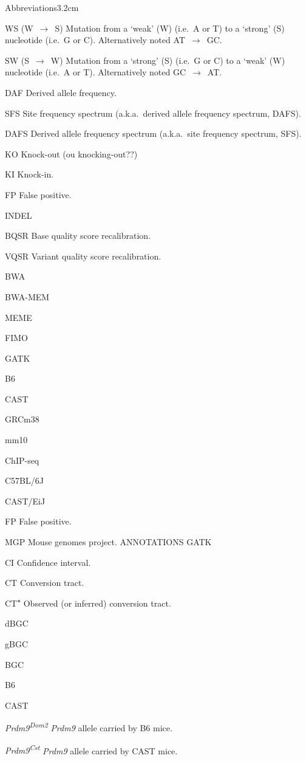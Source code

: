 \begin{mclistof}{Abbreviations}{3.2cm}
\item[WS (W~$\rightarrow$~S)] Mutation from a ‘weak’ (W) (i.e.\ A or T) to a ‘strong’ (S) nucleotide (i.e.\ G or C). Alternatively noted AT~$\rightarrow$~GC\@.
\item[SW (S~$\rightarrow$~W)] Mutation from a ‘strong’ (S) (i.e.\ G or C) to a ‘weak’ (W) nucleotide (i.e.\ A or T). Alternatively noted GC~$\rightarrow$~AT\@.
\item[DAF] Derived allele frequency.
\item[SFS] Site frequency spectrum (a.k.a.\ derived allele frequency spectrum, DAFS).
\item[DAFS] Derived allele frequency spectrum (a.k.a.\ site frequency spectrum, SFS).
\item[KO] Knock-out (ou knocking-out??)
\item[KI] Knock-in.
\item[FP] False positive.
\item[INDEL]
\item[BQSR] Base quality score recalibration.
\item[VQSR] Variant quality score recalibration.
\item[BWA]
\item[BWA-MEM]
\item[MEME]
\item[FIMO]
\item[GATK]
\item[B6]
\item[CAST]
\item[GRCm38]
\item[mm10]
\item[ChIP-seq]
\item[C57BL/6J]
\item[CAST/EiJ]
\item[FP] False positive.
\item[MGP] Mouse genomes project.
	ANNOTATIONS GATK
\item[CI] Confidence interval.
\item[CT] Conversion tract.
\item[CT\textsuperscript{$\star$}] Observed (or inferred) conversion tract.
\item[dBGC]
\item[gBGC]
\item[BGC]
\item[B6]
\item[CAST]
\item[\textit{Prdm9\textsuperscript{Dom2}}] \textit{Prdm9} allele carried by B6 mice.
\item[\textit{Prdm9\textsuperscript{Cst}}] \textit{Prdm9} allele carried by CAST mice.

\end{mclistof}
